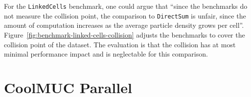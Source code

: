 \documentclass[11pt,
               a4paper,
               bibtotoc,
               idxtotoc,
               headsepline,
               footsepline,
               footexclude,
               BCOR12mm,
               DIV13,
               openany,   %
               ]
               {scrbook}
\begin{document}
For the \texttt{LinkedCells} benchmark, one could argue that ``since the benchmarks do not measure the collision point, the comparison to \texttt{DirectSum} is unfair, since the amount of computation increases as the average particle density grows per cell''. Figure~\ref{fig:benchmark-linked-cells-collision} adjusts the benchmarks to cover the collision point of the dataset. The evaluation is that the collision has at most minimal performance impact and is neglectable for this comparison.


\newpage
\section{CoolMUC Parallel}\label{section:coolmuc-parallel}
\end{document}
